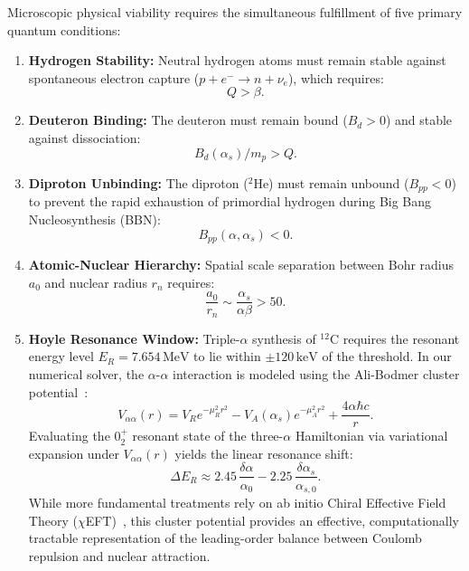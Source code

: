 \documentclass[aps,prd,twocolumn,superscriptaddress,nofootinbib,floatfix]{revtex4-2}
\begin{document}
Microscopic physical viability requires the simultaneous fulfillment of five primary quantum conditions:
\begin{enumerate}
    \item \textbf{Hydrogen Stability:} Neutral hydrogen atoms must remain stable against spontaneous electron capture ($p + e^- \to n + \nu_e$), which requires:
    \begin{equation}
        Q > \beta.
    \end{equation}
    \item \textbf{Deuteron Binding:} The deuteron must remain bound ($B_d > 0$) and stable against dissociation:
    \begin{equation}
        B_d(\alpha_s) / m_p > Q.
    \end{equation}
    \item \textbf{Diproton Unbinding:} The diproton ($^2\mathrm{He}$) must remain unbound ($B_{pp} < 0$) to prevent the rapid exhaustion of primordial hydrogen during Big Bang Nucleosynthesis (BBN):
    \begin{equation}
        B_{pp}(\alpha, \alpha_s) < 0.
    \end{equation}
    \item \textbf{Atomic-Nuclear Hierarchy:} Spatial scale separation between Bohr radius $a_0$ and nuclear radius $r_n$ requires:
    \begin{equation}
        \frac{a_0}{r_n} \sim \frac{\alpha_s}{\alpha \beta} > 50.
    \end{equation}
    \item \textbf{Hoyle Resonance Window:} Triple-$\alpha$ synthesis of $^{12}\mathrm{C}$ requires the resonant energy level $E_R = 7.654\,\text{MeV}$ to lie within $\pm 120\,\text{keV}$ of the threshold. In our numerical solver, the $\alpha$-$\alpha$ interaction is modeled using the Ali-Bodmer cluster potential~\cite{AliBodmer1966}:
    \begin{equation}
        V_{\alpha\alpha}(r) = V_R e^{-\mu_R^2 r^2} - V_A(\alpha_s) e^{-\mu_A^2 r^2} + \frac{4\alpha \hbar c}{r}.
    \end{equation}
    Evaluating the $0_2^+$ resonant state of the three-$\alpha$ Hamiltonian via variational expansion under $V_{\alpha\alpha}(r)$ yields the linear resonance shift:
    \begin{equation}
        \Delta E_R \approx 2.45\,\frac{\delta\alpha}{\alpha_0} - 2.25\,\frac{\delta\alpha_s}{\alpha_{s,0}}.
    \end{equation}
    While more fundamental treatments rely on ab initio Chiral Effective Field Theory ($\chi$EFT)~\cite{Epelbaum2013}, this cluster potential provides an effective, computationally tractable representation of the leading-order balance between Coulomb repulsion and nuclear attraction.
\end{enumerate}
\end{document}
